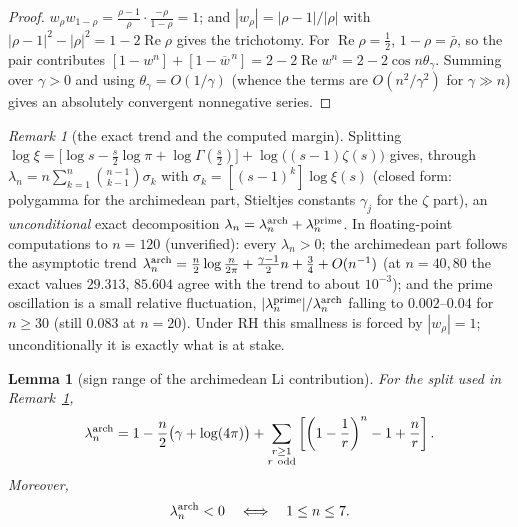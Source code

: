 \documentclass[11pt]{amsart}
\newtheorem{lemma}[theorem]{Lemma}
\theoremstyle{definition}
\theoremstyle{remark}
\newtheorem{remark}[theorem]{Remark}
\theoremstyle{definition}
\renewcommand{\Re}{\operatorname{Re}}
\begin{document}
\begin{proof}
$w_\rho w_{1-\rho}=\frac{\rho-1}{\rho}\cdot\frac{-\rho}{1-\rho}=1$; and $|w_\rho|=|\rho-1|/|\rho|$ with
$|\rho-1|^2-|\rho|^2=1-2\Re\rho$ gives the trichotomy.  For $\Re\rho=\tfrac12$, $1-\rho=\bar\rho$, so
the pair contributes $[1-w^n]+[1-\overline{w}^{\,n}]=2-2\Re w^n=2-2\cos n\theta_\gamma$.  Summing over
$\gamma>0$ and using $\theta_\gamma=O(1/\gamma)$ (whence the terms are $O(n^2/\gamma^2)$ for
$\gamma\gg n$) gives an absolutely convergent nonnegative series.
\end{proof}

\begin{remark}[the exact trend and the computed margin]\label{rmk:li-trend}
Splitting $\log\xi=\bigl[\log s-\tfrac s2\log\pi+\log\Gamma(\tfrac s2)\bigr]+\log\bigl((s-1)\zeta(s)
\bigr)$ gives, through $\lambda_n=n\sum_{k=1}^n\binom{n-1}{k-1}\sigma_k$ with
$\sigma_k=[(s-1)^k]\log\xi(s)$ (closed form: polygamma for the archimedean part, Stieltjes constants
$\gamma_j$ for the $\zeta$ part), an \emph{unconditional} exact decomposition
$\lambda_n=\lambda_n^{\rm arch}+\lambda_n^{\rm prime}$.  In floating-point computations to $n=120$ (unverified): every $\lambda_n>0$; the
archimedean part follows the asymptotic trend
$\lambda_n^{\rm arch}=\tfrac n2\log\tfrac n{2\pi}+\tfrac{\gamma-1}{2}n+\tfrac34+O(n^{-1})$
(at $n=40,80$ the exact values $29.313$, $85.604$ agree with the trend to about $10^{-3}$); and the prime oscillation is a small
relative fluctuation, $|\lambda_n^{\rm prime}|/\lambda_n^{\rm arch}$ falling to
$0.002$--$0.04$ for $n\ge30$ (still $0.083$ at $n=20$).  Under RH this smallness is forced by $|w_\rho|=1$; unconditionally it is
exactly what is at stake.
\end{remark}

\begin{lemma}[sign range of the archimedean Li contribution]\label{lem:li-arch-sign}
For the split used in Remark~\ref{rmk:li-trend},
\[
   \lambda_n^{\rm arch}
   =1-\frac n2\bigl(\gamma+\log(4\pi)\bigr)
    +\sum_{\substack{r\ge1\\ r\ \mathrm{odd}}}
      \left[\left(1-\frac1r\right)^n-1+\frac nr\right].
\]
Moreover,
\[
   \lambda_n^{\rm arch}<0\quad\Longleftrightarrow\quad1\le n\le7.
\]
\end{lemma}
\end{document}
